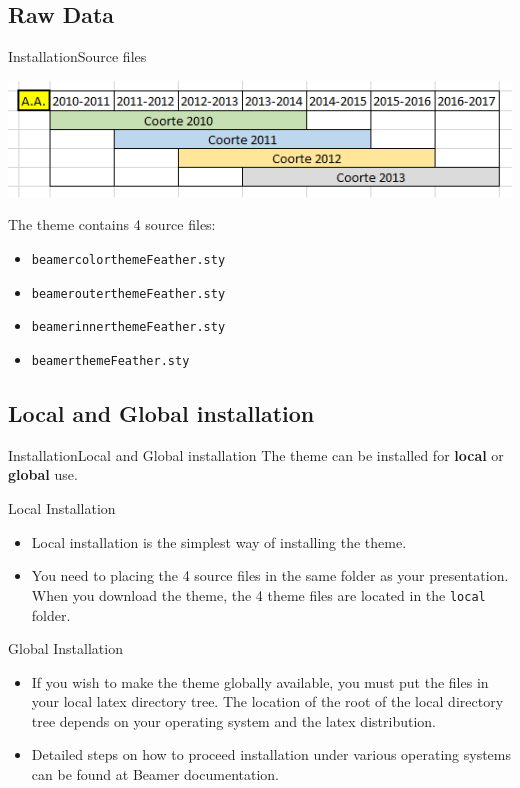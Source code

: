 \documentclass[12pt]{beamer}
\begin{document}
\subsection{Raw Data}
\begin{frame}{Installation}{Source files}

\includegraphics[scale=0.75]{../raw/stud_comp.png}


\begin{block}{}
The theme contains 4 source files:
  \begin{itemize}
	\item {\tt beamercolorthemeFeather.sty}
	\item {\tt beamerouterthemeFeather.sty}
	\item {\tt beamerinnerthemeFeather.sty}
	\item {\tt beamerthemeFeather.sty}
  \end{itemize}
\end{block}
\end{frame}

\subsection{Local and Global installation}
\begin{frame}{Installation}{Local and Global installation}
  The theme can be installed for \textbf{local} or \textbf{global} use.
  \pause
  \begin{block}{Local Installation}
  \begin{itemize}    
	\item Local installation is the simplest way of installing the theme. 
	\item You need to placing the 4 source files in the same folder as your presentation. When you download the theme, the 4 theme files are located in the {\tt local} folder.
  \end{itemize}
  \end{block}

  \begin{block}{Global Installation}
  \begin{itemize}
	 \item If you wish to make the theme globally available, you must put the files in your local latex directory tree. The location of the root of the local directory tree depends on your operating system and the latex distribution.
	 \item Detailed steps on how to proceed installation under various operating systems can be found at Beamer documentation.
  \end{itemize}
  \end{block}
\end{frame}
	 
\end{document}
